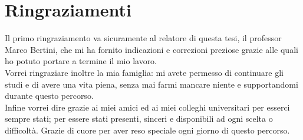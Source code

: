 \chapter{Ringraziamenti}\label{ch:ringraziamenti}
Il primo ringraziamento va sicuramente al relatore di questa tesi, il professor Marco Bertini, che mi ha fornito indicazioni e correzioni preziose grazie alle quali ho potuto portare a termine il mio lavoro.
\\Vorrei ringraziare inoltre la mia famiglia: mi avete permesso di continuare gli studi e di avere una vita piena, senza mai farmi mancare niente e supportandomi durante questo percorso.
\\Infine vorrei dire grazie ai miei amici ed ai miei colleghi universitari per esserci sempre stati; per essere stati presenti, sinceri e disponibili ad ogni scelta o difficoltà. Grazie di cuore per aver reso speciale ogni giorno di questo percorso.
